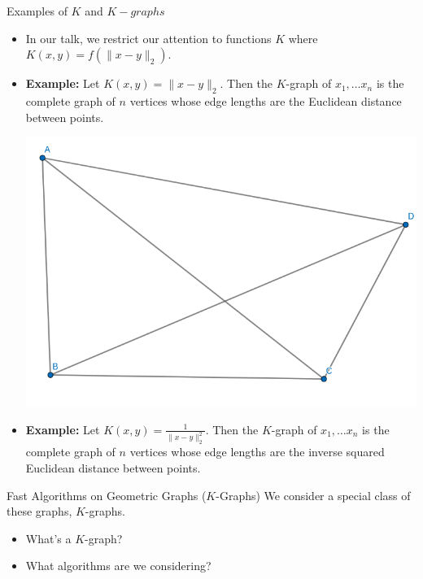 \begin{frame}{Examples of $K$ and $K-graphs$}
\begin{itemize}
  \item <+-> In our talk, we restrict our attention to functions $K$ where
    $K(x,y) = f(\|x-y\|_2)$.
  \item <+-> \textbf{Example:} Let $K(x,y) = \|x-y\|_2$. Then the $K$-graph
    of $x_1, \ldots x_n$ is the complete graph of $n$ vertices whose
    edge lengths are the Euclidean distance between points.
  \begin{center}
  \includegraphics[width=.4\textwidth]{figs/complete_euclidean_graph}
  \end{center}
  \item <+-> \textbf{Example:} Let $K(x,y) = \frac{1}{\|x-y\|_2^2}$. Then the $K$-graph
    of $x_1, \ldots x_n$ is the complete graph of $n$ vertices whose
    edge lengths are the inverse squared Euclidean distance between points.
\end{itemize}

\end{frame}

\begin{frame}{Fast Algorithms on Geometric Graphs ($K$-Graphs)}
  We consider a special class of these graphs, $K$-graphs.
  \begin{itemize}
  \item What's a $K$-graph?
  \item What algorithms are we considering?
\end{itemize}
\end{frame}

